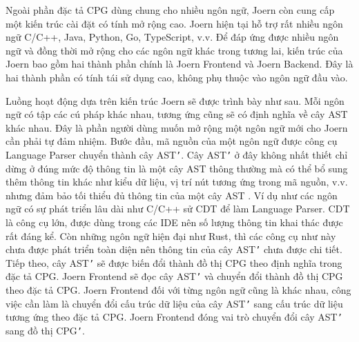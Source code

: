 Ngoài phần đặc tả CPG dùng chung cho nhiều ngôn ngữ, Joern còn cung cấp một kiến trúc cài đặt có tính mở rộng cao.
Joern hiện tại hỗ trợ rất nhiều ngôn ngữ C/C++, Java, Python, Go, TypeScript, v.v.
Để đáp ứng được nhiều ngôn ngữ và đồng thời mở rộng cho các ngôn ngữ khác trong tương lai, kiến trúc của Joern bao gồm hai thành phần chính là Joern Frontend và Joern Backend.
Đây là hai thành phần có tính tái sử dụng cao, không phụ thuộc vào ngôn ngữ đầu vào.

Luồng hoạt động dựa trên kiến trúc Joern sẽ được trình bày như sau.
Mỗi ngôn ngữ có tập các cú pháp khác nhau, tương ứng cũng sẽ có định nghĩa về cây AST khác nhau.
Đây là phần người dùng muốn mở rộng một ngôn ngữ mới cho Joern cần phải tự đảm nhiệm.
Bước đầu, mã nguồn của một ngôn ngữ được công cụ Language Parser chuyển thành cây AST\texttt{'}.
Cây AST\texttt{'} ở đây không nhất thiết chỉ dừng ở đúng mức độ thông tin là một cây AST thông thường mà có thể bổ sung thêm thông tin khác như kiểu dữ liệu, vị trí nút tương ứng trong mã nguồn, v.v. nhưng đảm bảo tối thiểu đủ thông tin của một cây AST .
Ví dụ như các ngôn ngữ có sự phát triển lâu dài như C/C++ sử CDT \cite{eclipseEclipseCC} để làm Language Parser.
CDT là công cụ lớn, được dùng trong các IDE nên số lượng thông tin khai thác được rất đáng kể.
Còn những ngôn ngữ hiện đại như Rust, thì các công cụ như này chưa được phát triển toàn diện nên thông tin của cây AST\texttt{'} chưa được chi tiết.
Tiếp theo, cây AST\texttt{'} sẽ được biến đổi thành đồ thị CPG theo định nghĩa trong đặc tả CPG.
Joern Frontend sẽ đọc cây AST\texttt{'} và chuyển đổi thành đồ thị CPG theo đặc tả CPG.
Joern Frontend đối với từng ngôn ngữ cũng là khác nhau, công việc cần làm là chuyển đổi cấu trúc dữ liệu của cây AST\texttt{'} sang cấu trúc dữ liệu tương ứng theo đặc tả CPG.
Joern Frontend đóng vai trò chuyển đổi cây AST\texttt{'} sang đồ thị CPG\texttt{'}.

